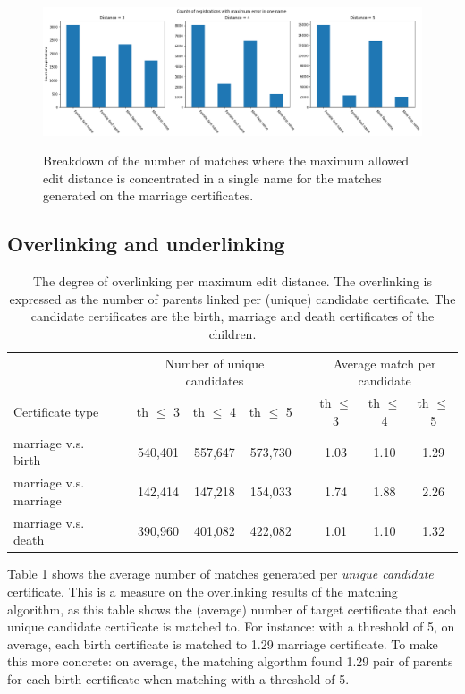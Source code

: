 \begin{figure}
	\begin{center}
		\caption[Count max error per name]{Breakdown of the number of matches where the maximum allowed edit distance is concentrated in a single name for the matches generated on the marriage certificates.}
		\centerline{\includegraphics[scale=0.45]{figures/distribution_max_error_per_name_mar.png}}
		\label{fig:dist_ed_per_name}
	\end{center}
	
\end{figure}

\subsection{Overlinking and underlinking}

\begin{table}[ht]
	\centering
	\caption[Degree of overlinking per maximum edit distance]{The degree of overlinking per maximum edit distance. The overlinking is expressed as the number of parents linked per (unique) candidate certificate. The candidate certificates are the birth, marriage and death certificates of the children. \label{tab:OverlinkingMatches}}
	\vspace{0.25cm}
	\begin{tabular}{llccclccc}
		\toprule
		&& \multicolumn{3}{c}{Number of unique candidates} && \multicolumn{3}{c}{Average match per candidate}\\
		\cmidrule{3-5} \cmidrule{7-9}
		Certificate type		&& th $\leq$ 3 & th $\leq$ 4 & th $\leq$ 5 && th $\leq$ 3 & th $\leq$ 4 & th $\leq$ 5\\
		\cmidrule{1-1}\cmidrule{3-5} \cmidrule{7-9}	
		marriage v.s. birth 	&& 540,401 & 557,647 & 573,730 && 1.03 & 1.10 & 1.29\\
		marriage v.s. marriage	&& 142,414 & 147,218 & 154,033 && 1.74 & 1.88 & 2.26\\
		marriage v.s. death 	&& 390,960 & 401,082 & 422,082 && 1.01 & 1.10 & 1.32\\
	 	\bottomrule
	\end{tabular}
\end{table}
Table \ref{tab:OverlinkingMatches} shows the average number of matches generated per \textit{unique candidate} certificate. This is a measure on the overlinking results of the matching algorithm, as this table shows the (average) number of target certificate that each unique candidate certificate is matched to. For instance: with a threshold of 5, on average, each birth certificate is matched to 1.29 marriage certificate. To make this more concrete: on average, the matching algorthm found 1.29 pair of parents for each birth certificate when matching with a threshold of 5.\\

